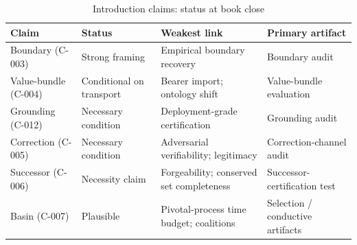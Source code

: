 \begin{table}[htbp]
\centering
\small
\caption{Introduction claims: status at book close}
\label{tab:claim-status-ch48}
\begin{tabular}{@{}p{}p{}p{}p{}@{}}
\toprule
\textbf{Claim} & \textbf{Status} & \textbf{Weakest link} & \textbf{Primary artifact} \\
\midrule
Boundary (C-003) & Strong framing & Empirical boundary recovery & Boundary audit \\
Value-bundle (C-004) & Conditional on transport & Bearer import; ontology shift & Value-bundle evaluation \\
Grounding (C-012) & Necessary condition & Deployment-grade certification & Grounding audit \\
Correction (C-005) & Necessary condition & Adversarial verifiability; legitimacy & Correction-channel audit \\
Successor (C-006) & Necessity claim & Forgeability; conserved set completeness & Successor-certification test \\
Basin (C-007) & Plausible & Pivotal-process time budget; coalitions & Selection / conductive artifacts \\
\bottomrule
\end{tabular}
\end{table}
